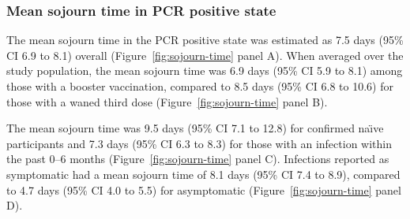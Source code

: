 \subsubsection{Mean sojourn time in PCR positive state}

The mean sojourn time in the PCR positive state was estimated as 7.5 days (95\% CI 6.9 to 8.1) overall (Figure~\ref{fig:sojourn-time} panel A). When averaged over the study population, the mean sojourn time was 6.9 days (95\% CI 5.9 to 8.1) among those with a booster vaccination, compared to 8.5 days (95\% CI 6.8 to 10.6) for those with a waned third dose (Figure~\ref{fig:sojourn-time} panel B).

The mean sojourn time was 9.5 days (95\% CI 7.1 to 12.8) for confirmed na\"{\i}ve participants and 7.3 days (95\% CI 6.3 to 8.3) for those with an infection within the past 0--6 months (Figure~\ref{fig:sojourn-time} panel C). Infections reported as symptomatic had a mean sojourn time of 8.1 days (95\% CI 7.4 to 8.9), compared to 4.7 days (95\% CI 4.0 to 5.5) for asymptomatic (Figure~\ref{fig:sojourn-time} panel D). 

